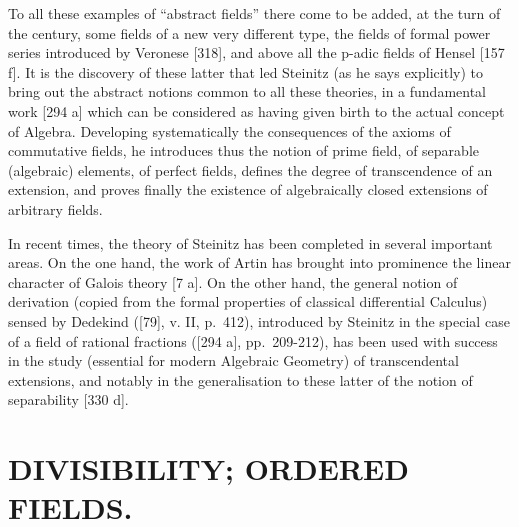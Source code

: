 To all these examples of ``abstract fields'' there come to be added, at the turn of the century, some fields of a new very different type, the fields of formal power series introduced by Veronese {[}318{]}, and above all the p-adic fields of Hensel {[}157 f{]}. It is the discovery of these latter that led Steinitz (as he says explicitly) to bring out the abstract notions common to all these theories, in a fundamental work {[}294 a{]} which can be considered as having given birth to the actual concept of Algebra. Developing systematically the consequences of the axioms of commutative fields, he introduces thus the notion of prime field, of separable (algebraic) elements, of perfect fields, defines the degree of transcendence of an extension, and proves finally the existence of algebraically closed extensions of arbitrary fields.

In recent times, the theory of Steinitz has been completed in several important areas. On the one hand, the work of Artin has brought into prominence the linear character of Galois theory {[}7 a{]}. On the other hand, the general notion of derivation (copied from the formal properties of classical differential Calculus) sensed by Dedekind ({[}79{]}, v. II, p.~412), introduced by Steinitz in the special case of a field of rational fractions ({[}294 a{]}, pp.~209-212), has been used with success in the study (essential for modern Algebraic Geometry) of transcendental extensions, and notably in the generalisation to these latter of the notion of separability {[}330 d{]}.

\chapter{DIVISIBILITY; ORDERED FIELDS.}


